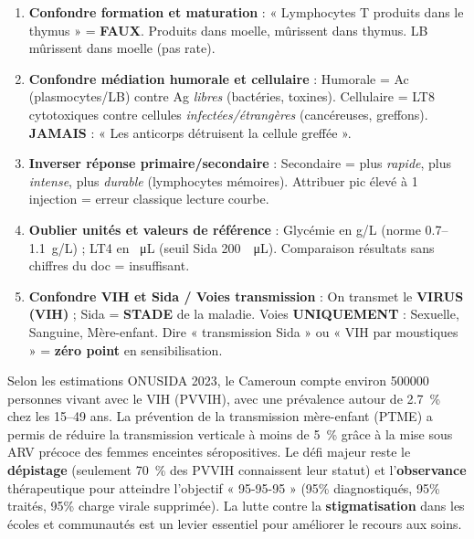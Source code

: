 \documentclass[11pt]{article}
\begin{document}
\begin{attention}
\begin{enumerate}
\item \textbf{Confondre formation et maturation} : « Lymphocytes T produits dans le thymus » = \textbf{FAUX}. Produits dans moelle, mûrissent dans thymus. LB mûrissent dans moelle (pas rate).
\item \textbf{Confondre médiation humorale et cellulaire} : Humorale = Ac (plasmocytes/LB) contre Ag \emph{libres} (bactéries, toxines). Cellulaire = LT8 cytotoxiques contre cellules \emph{infectées/étrangères} (cancéreuses, greffons). \textbf{JAMAIS} : « Les anticorps détruisent la cellule greffée ».
\item \textbf{Inverser réponse primaire/secondaire} : Secondaire = plus \emph{rapide}, plus \emph{intense}, plus \emph{durable} (lymphocytes mémoires). Attribuer pic élevé à 1\iere{} injection = erreur classique lecture courbe.
\item \textbf{Oublier unités et valeurs de référence} : Glycémie en \si{g/L} (norme \num{0,7}--\SI{1,1}{g/L}) ; LT4 en \si{\per\micro\liter} (seuil Sida \SI{200}{\per\micro\liter}). Comparaison résultats sans chiffres du doc = insuffisant.
\item \textbf{Confondre VIH et Sida / Voies transmission} : On transmet le \textbf{VIRUS (VIH)} ; Sida = \textbf{STADE} de la maladie. Voies \textbf{UNIQUEMENT} : Sexuelle, Sanguine, Mère-enfant. Dire « transmission Sida » ou « VIH par moustiques » = \textbf{zéro point} en sensibilisation.
\end{enumerate}
\end{attention}

\begin{savaistu}
Selon les estimations ONUSIDA 2023, le Cameroun compte environ \num{500000} personnes vivant avec le VIH (PVVIH), avec une prévalence autour de \SI{2,7}{\%} chez les 15--49 ans. La prévention de la transmission mère-enfant (PTME) a permis de réduire la transmission verticale à moins de \SI{5}{\%} grâce à la mise sous ARV précoce des femmes enceintes séropositives. Le défi majeur reste le \textbf{dépistage} (seulement \SI{70}{\%} des PVVIH connaissent leur statut) et l'\textbf{observance} thérapeutique pour atteindre l'objectif « 95-95-95 » (95\% diagnostiqués, 95\% traités, 95\% charge virale supprimée). La lutte contre la \textbf{stigmatisation} dans les écoles et communautés est un levier essentiel pour améliorer le recours aux soins.
\end{savaistu}
\end{document}
